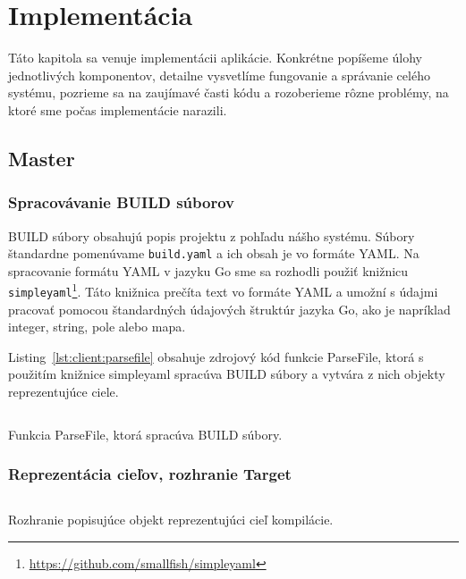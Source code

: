 \chapter{Implement\'{a}cia}
\label{ch:impl}

Táto kapitola sa venuje implementácii aplikácie. Konkrétne popíšeme úlohy
jednotlivých komponentov, detailne vysvetlíme fungovanie a správanie celého
systému, pozrieme sa na zaujímavé časti kódu a rozoberieme rôzne problémy,
na ktoré sme počas implementácie narazili.

\section{Master}
\label{sec:master}

\subsection{Spracov\'{a}vanie BUILD s\'{u}borov}
\label{sec:master:buildfile}

BUILD súbory obsahujú popis projektu z pohľadu nášho systému. Súbory štandardne
pomenúvame \texttt{build.yaml} a ich obsah je vo formáte YAML\@. Na spracovanie
formátu YAML v jazyku Go sme sa rozhodli použiť knižnicu
\texttt{simpleyaml}\footnote{\url{https://github.com/smallfish/simpleyaml}}.
Táto knižnica prečíta text vo formáte YAML a umožní s údajmi pracovať pomocou
štandardných údajových štruktúr jazyka Go, ako je napríklad integer, string,
pole alebo mapa.

Listing~\ref{lst:client:parsefile} obsahuje zdrojový kód funkcie ParseFile, ktorá
s použitím knižnice simpleyaml spracúva BUILD súbory a vytvára z nich objekty
reprezentujúce ciele.

\begin{listing}[H]
  \inputminted[frame=lines,framesep=2mm,linenos,fontsize=\scriptsize,firstline=48,lastline=79]{go}{/home/pepol/src/imterra/forge/client/target/parse.go}
  \caption[Funkcia ParseFile]{Funkcia ParseFile, ktorá spracúva BUILD súbory.}
  \label{lst:client:parsefile}
\end{listing}

\subsection{Reprezentácia cieľov, rozhranie Target}
\label{sec:master:target}

\begin{listing}[H]
  \inputminted[frame=lines,framesep=2mm,linenos,fontsize=\scriptsize,firstline=7,lastline=13]{go}{/home/pepol/src/imterra/forge/client/target/target.go}
  \caption[Rozhranie Target]{Rozhranie popisujúce objekt reprezentujúci cieľ kompilácie.}
  \label{lst:client:target}
\end{listing}

